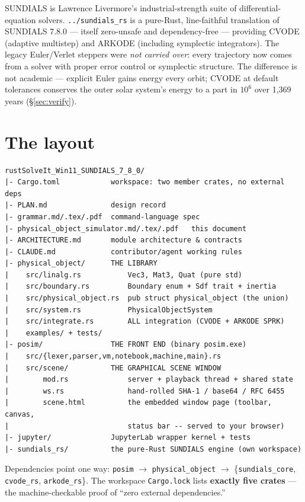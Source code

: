\documentclass[11pt]{article}
\newcommand{\code}[1]{\texttt{#1}}
\begin{document}
SUNDIALS is Lawrence Livermore's industrial-strength suite of
differential-equation solvers. \code{../sundials\_rs} is a pure-Rust,
line-faithful translation of SUNDIALS 7.8.0 --- itself zero-unsafe and
dependency-free --- providing CVODE (adaptive multistep) and ARKODE
(including symplectic integrators). The legacy Euler/Verlet steppers
were \emph{not carried over}: every trajectory now comes from a solver
with proper error control or symplectic structure. The difference is not
academic --- explicit Euler gains energy every orbit; CVODE at default
tolerances conserves the outer solar system's energy to a part in
$10^{6}$ over 1{,}369 years (\S\ref{sec:verify}).

\section{The layout}

\begin{lstlisting}
rustSolveIt_Win11_SUNDIALS_7_8_0/
|- Cargo.toml            workspace: two member crates, no external deps
|- PLAN.md               design record
|- grammar.md/.tex/.pdf  command-language spec
|- physical_object_simulator.md/.tex/.pdf   this document
|- ARCHITECTURE.md       module architecture & contracts
|- CLAUDE.md             contributor/agent working rules
|- physical_object/      THE LIBRARY
|    src/linalg.rs           Vec3, Mat3, Quat (pure std)
|    src/boundary.rs         Boundary enum + Sdf trait + inertia
|    src/physical_object.rs  pub struct physical_object (the union)
|    src/system.rs           PhysicalObjectSystem
|    src/integrate.rs        ALL integration (CVODE + ARKODE SPRK)
|    examples/ + tests/
|- posim/                THE FRONT END (binary posim.exe)
|    src/{lexer,parser,vm,notebook,machine,main}.rs
|    src/scene/          THE GRAPHICAL SCENE WINDOW
|        mod.rs              server + playback thread + shared state
|        ws.rs               hand-rolled SHA-1 / base64 / RFC 6455
|        scene.html          the embedded window page (toolbar, canvas,
|                            status bar -- served to your browser)
|- jupyter/              JupyterLab wrapper kernel + tests
|- sundials_rs/          the pure-Rust SUNDIALS engine (own workspace)
\end{lstlisting}

Dependencies point one way:
\code{posim} $\to$ \code{physical\_object} $\to$
\{\code{sundials\_core}, \code{cvode\_rs}, \code{arkode\_rs}\}. The
workspace \code{Cargo.lock} lists \textbf{exactly five crates} --- the
machine-checkable proof of ``zero external dependencies.''
\end{document}
